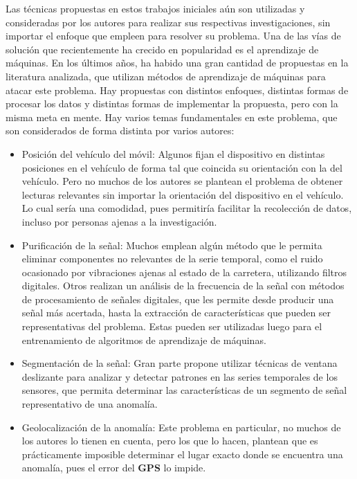 	Las técnicas propuestas en estos trabajos iniciales aún son utilizadas y consideradas por los autores para realizar sus respectivas investigaciones,
	sin importar el enfoque que empleen para resolver su problema. Una de las vías de solución que recientemente ha crecido en popularidad es el aprendizaje
	de máquinas. En los últimos años, ha habido una gran cantidad de propuestas en la literatura analizada, que utilizan métodos de aprendizaje de máquinas
	para atacar este problema. Hay propuestas con distintos enfoques, distintas formas de procesar los datos y distintas formas de implementar la propuesta,
	pero con la misma meta en mente. Hay varios temas fundamentales en este problema, que son considerados de forma distinta por varios autores:

	\begin{itemize}
		\item Posición del vehículo del móvil: Algunos fijan el dispositivo en distintas posiciones en el vehículo de forma tal que coincida su orientación
			con la del vehículo. Pero no muchos de los autores se plantean el problema de obtener lecturas relevantes sin importar la orientación del
			dispositivo en el vehículo. Lo cual sería una comodidad, pues permitiría facilitar la recolección de datos, incluso por personas ajenas a la
			investigación.

		\item Purificación de la señal: Muchos emplean algún método que le permita eliminar componentes no relevantes de la serie temporal, como
			el ruido ocasionado por vibraciones ajenas al estado de la carretera, utilizando filtros digitales. Otros realizan un análisis de la frecuencia
			de la señal con métodos de procesamiento de señales digitales, que les permite desde producir una señal más acertada, hasta la extracción de
			características que pueden ser representativas del problema. Estas pueden ser utilizadas luego para el entrenamiento de algoritmos de aprendizaje
			de máquinas.

		\item Segmentación de la señal: Gran parte propone utilizar técnicas de ventana deslizante para analizar y detectar
			patrones en las series temporales de los sensores, que permita determinar las características de un segmento de señal representativo de
			una anomalía.

		\item Geolocalización de la anomalía: Este problema en particular, no muchos de los autores lo tienen en cuenta, pero los que lo hacen, plantean
			que es prácticamente imposible determinar el lugar exacto donde se encuentra una anomalía, pues el error del \textbf{GPS} lo impide. 


\end{itemize}
